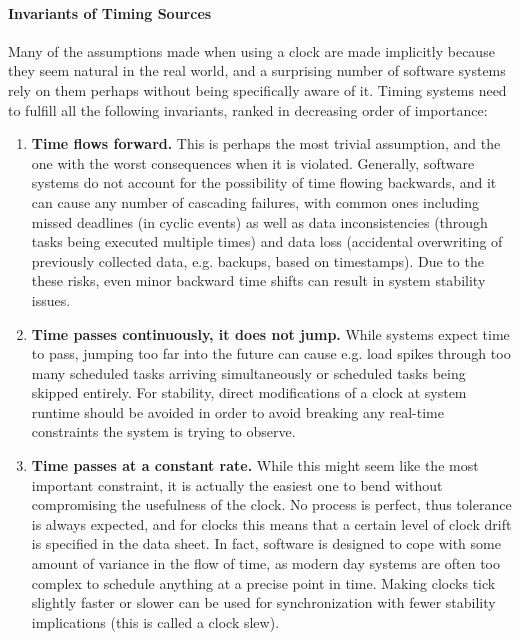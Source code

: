 \paragraph*{Invariants of Timing Sources} Many of the assumptions made when using a clock are made implicitly because they seem natural in the real world, and a surprising number of software systems rely on them perhaps without being specifically aware of it. Timing systems need to fulfill all the following invariants, ranked in decreasing order of importance:

\begin{enumerate}[label=I\arabic*.]
    \item \textbf{Time flows forward.} This is perhaps the most trivial assumption, and the one with the worst consequences when it is violated. Generally, software systems do not account for the possibility of time flowing backwards, and it can cause any number of cascading failures, with common ones including missed deadlines (in cyclic events) as well as data inconsistencies (through tasks being executed multiple times) and data loss (accidental overwriting of previously collected data, e.g. backups, based on timestamps). Due to the these risks, even minor backward time shifts can result in system stability issues.
    \item \textbf{Time passes continuously, it does not jump.} While systems expect time to pass, jumping too far into the future can cause e.g. load spikes through too many scheduled tasks arriving simultaneously or scheduled tasks being skipped entirely. For stability, direct modifications of a clock at system runtime should be avoided in order to avoid breaking any real-time constraints the system is trying to observe.
    \item \textbf{Time passes at a constant rate.} While this might seem like the most important constraint, it is actually the easiest one to bend without compromising the usefulness of the clock. No process is perfect, thus tolerance is always expected, and for clocks this means that a certain level of clock drift is specified in the data sheet. In fact, software is designed to cope with some amount of variance in the flow of time, as modern day systems are often too complex to schedule anything at a precise point in time. Making clocks tick slightly faster or slower can be used for synchronization with fewer stability implications (this is called a clock slew).
    \setcounter{errorConditions}{\value{enumi}}
\end{enumerate}

